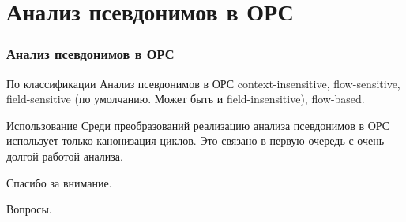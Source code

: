 \documentclass[utf8,russian]{beamer}
\begin{document}
\section{Анализ псевдонимов в ОРС}

\begin{frame}
\frametitle{Анализ псевдонимов в ОРС}
\begin{block}{По классификации}
Анализ псевдонимов в ОРС context-insensitive, flow-sensitive, field-sensitive (по умолчанию. Может быть и field-insensitive), flow-based.
\end{block}

\begin{block}{Использование}
Среди преобразований реализацию анализа псевдонимов в ОРС использует только канонизация циклов.
Это связано в первую очередь с очень долгой работой анализа.
\end{block}
\end{frame}

\begin{frame}
\Huge{\centerline{Спасибо за внимание.}}
\bigskip
\large{\centerline{Вопросы.}}
\end{frame}

\end{document}
